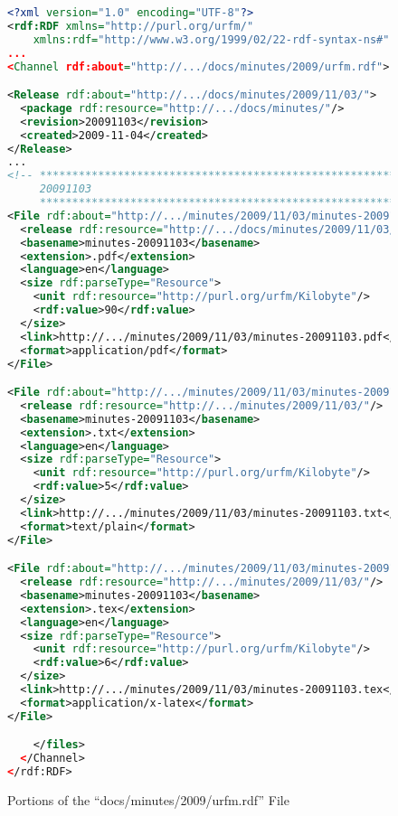\begin{figure}[ht]
\caption{Portions of the ``docs/minutes/2009/urfm.rdf'' File}
\label{WebsitePublishingMinutesMetadataURFM}
\begin{lstlisting}[language=XML]
<?xml version="1.0" encoding="UTF-8"?>
<rdf:RDF xmlns="http://purl.org/urfm/"
    xmlns:rdf="http://www.w3.org/1999/02/22-rdf-syntax-ns#"
...
<Channel rdf:about="http://.../docs/minutes/2009/urfm.rdf">

<Release rdf:about="http://.../docs/minutes/2009/11/03/">
  <package rdf:resource="http://.../docs/minutes/"/>
  <revision>20091103</revision>
  <created>2009-11-04</created>
</Release>
...
<!-- *********************************************************
     20091103                                                 
     ********************************************************* -->
<File rdf:about="http://.../minutes/2009/11/03/minutes-20091103.pdf">
  <release rdf:resource="http://.../docs/minutes/2009/11/03/"/>
  <basename>minutes-20091103</basename>
  <extension>.pdf</extension>
  <language>en</language>
  <size rdf:parseType="Resource">
    <unit rdf:resource="http://purl.org/urfm/Kilobyte"/>
    <rdf:value>90</rdf:value>
  </size>
  <link>http://.../minutes/2009/11/03/minutes-20091103.pdf</link>
  <format>application/pdf</format>
</File>

<File rdf:about="http://.../minutes/2009/11/03/minutes-20091103.txt">
  <release rdf:resource="http://.../minutes/2009/11/03/"/>
  <basename>minutes-20091103</basename>
  <extension>.txt</extension>
  <language>en</language>
  <size rdf:parseType="Resource">
    <unit rdf:resource="http://purl.org/urfm/Kilobyte"/>
    <rdf:value>5</rdf:value>
  </size>
  <link>http://.../minutes/2009/11/03/minutes-20091103.txt</link>
  <format>text/plain</format>
</File>

<File rdf:about="http://.../minutes/2009/11/03/minutes-20091103.tex">
  <release rdf:resource="http://.../minutes/2009/11/03/"/>
  <basename>minutes-20091103</basename>
  <extension>.tex</extension>
  <language>en</language>
  <size rdf:parseType="Resource">
    <unit rdf:resource="http://purl.org/urfm/Kilobyte"/>
    <rdf:value>6</rdf:value>
  </size>
  <link>http://.../minutes/2009/11/03/minutes-20091103.tex</link>
  <format>application/x-latex</format>
</File>

    </files>
  </Channel>
</rdf:RDF>
\end{lstlisting}
\end{figure}
